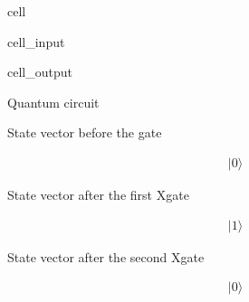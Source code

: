 \documentclass[letterpaper,10pt,english]{jupyterBook}
\begin{document}
\begin{sphinxuseclass}{cell}
\begin{sphinxVerbatimInput}
\begin{sphinxuseclass}{cell_input}
\begin{sphinxVerbatim}[commandchars=\\\{\}]
    
\end{sphinxVerbatim}

\end{sphinxuseclass}\end{sphinxVerbatimInput}
\begin{sphinxVerbatimOutput}

\begin{sphinxuseclass}{cell_output}
\begin{sphinxVerbatim}[commandchars=\\\{\}]
\PYGZsq{}Quantum circuit\PYGZsq{}
\end{sphinxVerbatim}

\noindent{}

\begin{sphinxVerbatim}[commandchars=\\\{\}]
\PYGZsq{}State vector before the gate\PYGZsq{}
\end{sphinxVerbatim}
\begin{equation*}
\begin{split} |0\rangle\end{split}
\end{equation*}
\begin{sphinxVerbatim}[commandchars=\\\{\}]
\PYGZsq{}State vector after the first Xgate\PYGZsq{}
\end{sphinxVerbatim}
\begin{equation*}
\begin{split} |1\rangle\end{split}
\end{equation*}
\begin{sphinxVerbatim}[commandchars=\\\{\}]
\PYGZsq{}State vector after the second Xgate\PYGZsq{}
\end{sphinxVerbatim}
\begin{equation*}
\begin{split} |0\rangle\end{split}
\end{equation*}
\end{sphinxuseclass}\end{sphinxVerbatimOutput}

\end{sphinxuseclass}
\end{document}

